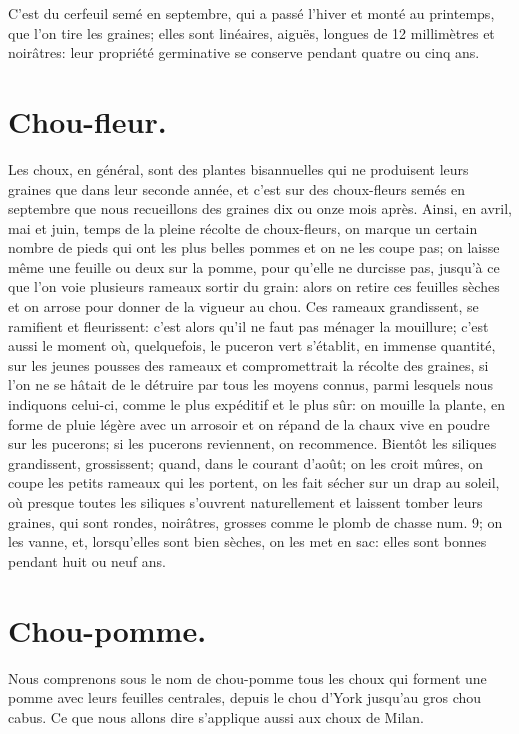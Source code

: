 \documentclass[10pt,a4paper]{book}
\begin{document}
C'est du cerfeuil semé en septembre, qui a passé l'hiver et monté au printemps, que l'on tire les graines; elles sont linéaires, aiguës, longues de 12 millimètres et noirâtres: leur propriété germinative se conserve pendant quatre ou cinq ans.

\section{Chou-fleur.}

Les choux, en général, sont des plantes bisannuelles qui ne produisent leurs graines que dans leur seconde année, et c'est sur des choux-fleurs semés en septembre que nous recueillons des graines dix ou onze mois après. Ainsi, en avril, mai et juin, temps de la pleine récolte de choux-fleurs, on marque un certain nombre de pieds qui ont les plus belles pommes et on ne les coupe pas; on laisse même une feuille ou deux sur la pomme, pour qu'elle ne durcisse pas, jusqu'à ce que l'on voie plusieurs rameaux sortir du grain: alors on retire ces feuilles sèches et on arrose pour donner de la vigueur au chou. Ces rameaux grandissent, se ramifient et fleurissent: c'est alors qu'il ne faut pas ménager la mouillure; c'est aussi le moment où, quelquefois, le puceron vert s'établit, en immense quantité, sur les jeunes pousses des rameaux et compromettrait la récolte des graines, si l'on ne se hâtait de le détruire par tous les moyens connus, parmi lesquels nous indiquons celui-ci, comme le plus expéditif et le plus sûr: on mouille la plante, en forme de pluie légère avec un arrosoir et on répand de la chaux vive en poudre sur les pucerons; si les pucerons reviennent, on recommence. Bientôt les siliques grandissent, grossissent; quand, dans le courant d'août; on les croit mûres, on coupe les petits rameaux qui les portent, on les fait sécher sur un drap au soleil, où presque toutes les siliques s'ouvrent naturellement et laissent tomber leurs graines, qui sont rondes, noirâtres, grosses comme le plomb de chasse num. 9; on les vanne, et, lorsqu'elles sont bien sèches, on les met en sac: elles sont bonnes pendant huit ou neuf ans.

\section{Chou-pomme.}

Nous comprenons sous le nom de chou-pomme tous les choux qui forment une pomme avec leurs feuilles centrales, depuis le chou d'York jusqu'au gros chou cabus. Ce que nous allons dire s'applique aussi aux choux de Milan.
\end{document}
